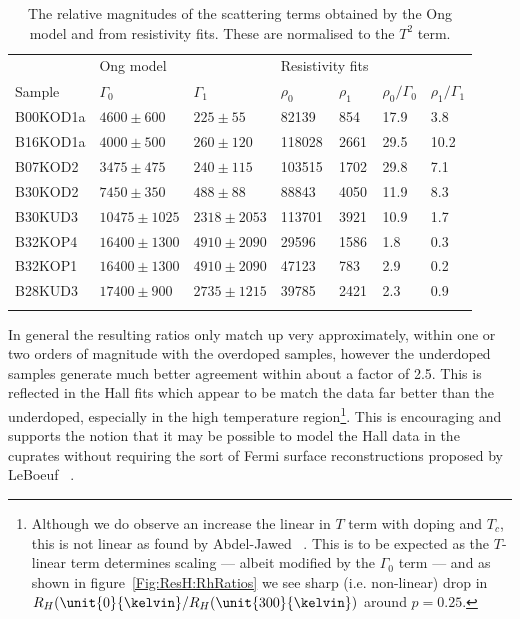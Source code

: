 \begin{table}
    \begin{center}
           \caption{The relative magnitudes of the scattering terms obtained by the Ong model and from resistivity fits. These are normalised to the $T^2$ term.}
        \begin{tabular}[htbp]{lllllll}
\toprule
	& \multicolumn{2}{l}{Ong model}	& \multicolumn{2}{l}{Resistivity fits} & & \\
Sample  & $\Gamma_0$    & $\Gamma_1$    & $\rho_0$  & $\rho_1$  & $\rho_0/\Gamma_0$ & $\rho_1/\Gamma_1$ \\
\midrule
B00KOD1a	& $4600\pm600$	& $225\pm55$	& 82139	& 854	& 17.9	& 3.8 \\
B16KOD1a	& $4000\pm500$	& $260\pm120$	& 118028	& 2661	& 29.5	& 10.2 \\
B07KOD2	& $3475\pm475$	& $240\pm115$	& 103515	& 1702	& 29.8	& 7.1 \\
B30KOD2	& $7450\pm350$	& $488\pm88$	& 88843	& 4050	& 11.9	& 8.3 \\
B30KUD3	& $10475\pm1025$	& $2318\pm2053$	& 113701	& 3921	& 10.9	& 1.7 \\
B32KOP4	& $16400\pm1300$	& $4910\pm2090$	& 29596	& 1586	& 1.8	& 0.3 \\
B32KOP1	& $16400\pm1300$	& $4910\pm2090$	& 47123	& 783	& 2.9	& 0.2 \\
B28KUD3	& $17400\pm900$	& $2735\pm1215$	& 39785	& 2421	& 2.3	& 0.9 \\

\bottomrule
        \label{Tab:ResH:OngFits}
        \end{tabular}
    \end{center}
\end{table}

In general the resulting ratios only match up very approximately, within one or two orders of magnitude with the overdoped samples, however the underdoped samples generate much better agreement within about a factor of 2.5. This is reflected in the Hall fits which appear to be match the data far better than the underdoped, especially in the high temperature region\footnote{Although we do observe an increase the linear in $T$ term with doping and $T_c$, this is not linear as found by Abdel-Jawed \etal~\cite{Abdel-Jawad2007}. This is to be expected as the $T$-linear term determines scaling --- albeit modified by the $\Gamma_0$ term --- and as shown in figure~\ref{Fig:ResH:RhRatios} we see sharp (i.e. non-linear) drop in $R_H(\unit{0}{\kelvin}/R_H(\unit{300}{\kelvin})$ around $p=0.25$.}. This is encouraging and supports the notion that it may be possible to model the Hall data in the cuprates without requiring the sort of Fermi surface reconstructions proposed by LeBoeuf \etal~\cite{LeBoeuf2011}.



